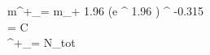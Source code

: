\ln m^+_\omega = \ln m_\omega + 1.96 \sigma \cdot (e ^ {1.96 \sigma}) ^ {-0.315}\\
\sigma =  {\sqrt C}\\
\mu^+_\omega =  {N_{tot}}
